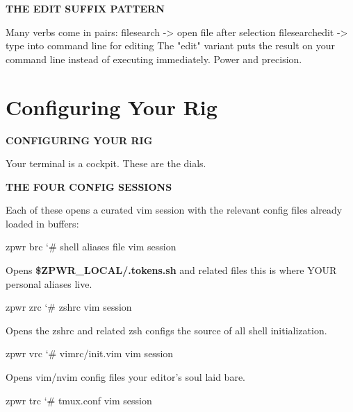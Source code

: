 \documentclass[11pt,a4paper,twoside]{book}
\begin{document}
\vspace{12pt}
{\bfseries\color{neonyellow} THE EDIT SUFFIX PATTERN}\vspace{4pt}

Many verbs come in pairs: filesearch      -> open file after selection filesearchedit  -> type into command line for editing The "edit" variant puts the result on your command line instead of executing immediately. Power and precision.


\vspace{16pt}

\section{Configuring Your Rig}


\vspace{10pt}
{\large\bfseries\color{neoncyan} CONFIGURING YOUR RIG}\vspace{6pt}

Your terminal is a cockpit. These are the dials.


\vspace{12pt}
{\bfseries\color{neonyellow} THE FOUR CONFIG SESSIONS}\vspace{4pt}

Each of these opens a curated vim session with the relevant config files already loaded in buffers:

\begin{codebox}
\color{neongreen}zpwr brc    {\char`\#} shell aliases file vim session\\
\end{codebox}

Opens \textbf{\$ZPWR\_LOCAL/.tokens.sh} and related files this is where YOUR personal aliases live.

\begin{codebox}
\color{neongreen}zpwr zrc    {\char`\#} zshrc vim session\\
\end{codebox}

Opens the zshrc and related zsh configs the source of all shell initialization.

\begin{codebox}
\color{neongreen}zpwr vrc    {\char`\#} vimrc/init.vim vim session\\
\end{codebox}

Opens vim/nvim config files your editor's soul laid bare.

\begin{codebox}
\color{neongreen}zpwr trc    {\char`\#} tmux.conf vim session\\
\end{codebox}
\end{document}
